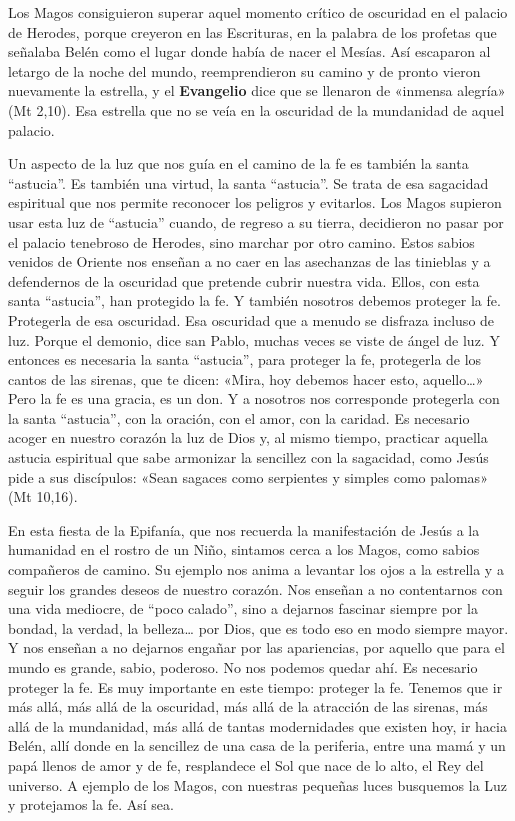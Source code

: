 \documentclass[]{article}
\begin{document}
Los Magos consiguieron superar aquel momento crítico de oscuridad en el
palacio de Herodes, porque creyeron en las Escrituras, en la palabra de
los profetas que señalaba Belén como el lugar donde había de nacer el
Mesías. Así escaparon al letargo de la noche del mundo, reemprendieron
su camino y de pronto vieron nuevamente la estrella, y el
\textbf{Evangelio} dice que se llenaron de «inmensa alegría» (Mt 2,10).
Esa estrella que no se veía en la oscuridad de la mundanidad de aquel
palacio.

Un aspecto de la luz que nos guía en el camino de la fe es también la
santa ``astucia''. Es también una virtud, la santa ``astucia''. Se trata
de esa sagacidad espiritual que nos permite reconocer los peligros y
evitarlos. Los Magos supieron usar esta luz de ``astucia'' cuando, de
regreso a su tierra, decidieron no pasar por el palacio tenebroso de
Herodes, sino marchar por otro camino. Estos sabios venidos de Oriente
nos enseñan a no caer en las asechanzas de las tinieblas y a defendernos
de la oscuridad que pretende cubrir nuestra vida. Ellos, con esta santa
``astucia'', han protegido la fe. Y también nosotros debemos proteger la
fe. Protegerla de esa oscuridad. Esa oscuridad que a menudo se disfraza
incluso de luz. Porque el demonio, dice san Pablo, muchas veces se viste
de ángel de luz. Y entonces es necesaria la santa ``astucia'', para
proteger la fe, protegerla de los cantos de las sirenas, que te dicen:
«Mira, hoy debemos hacer esto, aquello\ldots{}» Pero la fe es una
gracia, es un don. Y a nosotros nos corresponde protegerla con la santa
``astucia'', con la oración, con el amor, con la caridad. Es necesario
acoger en nuestro corazón la luz de Dios y, al mismo tiempo, practicar
aquella astucia espiritual que sabe armonizar la sencillez con la
sagacidad, como Jesús pide a sus discípulos: «Sean sagaces como
serpientes y simples como palomas» (Mt 10,16).

En esta fiesta de la Epifanía, que nos recuerda la manifestación de
Jesús a la humanidad en el rostro de un Niño, sintamos cerca a los
Magos, como sabios compañeros de camino. Su ejemplo nos anima a levantar
los ojos a la estrella y a seguir los grandes deseos de nuestro corazón.
Nos enseñan a no contentarnos con una vida mediocre, de ``poco calado'',
sino a dejarnos fascinar siempre por la bondad, la verdad, la
belleza\ldots{} por Dios, que es todo eso en modo siempre mayor. Y nos
enseñan a no dejarnos engañar por las apariencias, por aquello que para
el mundo es grande, sabio, poderoso. No nos podemos quedar ahí. Es
necesario proteger la fe. Es muy importante en este tiempo: proteger la
fe. Tenemos que ir más allá, más allá de la oscuridad, más allá de la
atracción de las sirenas, más allá de la mundanidad, más allá de tantas
modernidades que existen hoy, ir hacia Belén, allí donde en la sencillez
de una casa de la periferia, entre una mamá y un papá llenos de amor y
de fe, resplandece el Sol que nace de lo alto, el Rey del universo. A
ejemplo de los Magos, con nuestras pequeñas luces busquemos la Luz y
protejamos la fe. Así sea.
\end{document}
